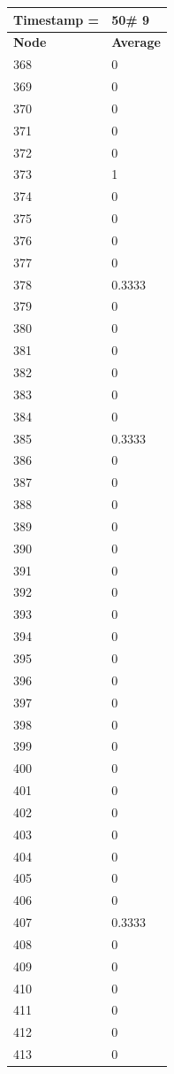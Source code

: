 \begin{tabular}{|l||l|}
\hline
\textbf{Timestamp =} & \textbf{50}\# 9\\\hline
	\textbf{Node} & \textbf{Average} \\ \hline
\hline
	368 & 0 \\ \hline
	369 & 0 \\ \hline
	370 & 0 \\ \hline
	371 & 0 \\ \hline
	372 & 0 \\ \hline
	373 & 1 \\ \hline
	374 & 0 \\ \hline
	375 & 0 \\ \hline
	376 & 0 \\ \hline
	377 & 0 \\ \hline
	378 & 0.3333 \\ \hline
	379 & 0 \\ \hline
	380 & 0 \\ \hline
	381 & 0 \\ \hline
	382 & 0 \\ \hline
	383 & 0 \\ \hline
	384 & 0 \\ \hline
	385 & 0.3333 \\ \hline
	386 & 0 \\ \hline
	387 & 0 \\ \hline
	388 & 0 \\ \hline
	389 & 0 \\ \hline
	390 & 0 \\ \hline
	391 & 0 \\ \hline
	392 & 0 \\ \hline
	393 & 0 \\ \hline
	394 & 0 \\ \hline
	395 & 0 \\ \hline
	396 & 0 \\ \hline
	397 & 0 \\ \hline
	398 & 0 \\ \hline
	399 & 0 \\ \hline
	400 & 0 \\ \hline
	401 & 0 \\ \hline
	402 & 0 \\ \hline
	403 & 0 \\ \hline
	404 & 0 \\ \hline
	405 & 0 \\ \hline
	406 & 0 \\ \hline
	407 & 0.3333 \\ \hline
	408 & 0 \\ \hline
	409 & 0 \\ \hline
	410 & 0 \\ \hline
	411 & 0 \\ \hline
	412 & 0 \\ \hline
	413 & 0 \\ \hline
\end{tabular}

